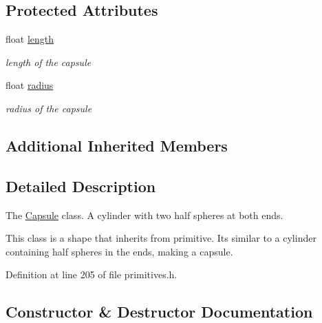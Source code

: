 \subsection*{Protected Attributes}
\begin{DoxyCompactItemize}
\item 
float \hyperlink{class_capsule_af62f20ecfc37b4c8ae88dd505ca1f196}{length}\hypertarget{class_capsule_af62f20ecfc37b4c8ae88dd505ca1f196}{}\label{class_capsule_af62f20ecfc37b4c8ae88dd505ca1f196}

\begin{DoxyCompactList}\small\item\em length of the capsule \end{DoxyCompactList}\item 
float \hyperlink{class_capsule_a9b7e591748a2b735b35d99a2d7792f39}{radius}\hypertarget{class_capsule_a9b7e591748a2b735b35d99a2d7792f39}{}\label{class_capsule_a9b7e591748a2b735b35d99a2d7792f39}

\begin{DoxyCompactList}\small\item\em radius of the capsule \end{DoxyCompactList}\end{DoxyCompactItemize}
\subsection*{Additional Inherited Members}


\subsection{Detailed Description}
The \hyperlink{class_capsule}{Capsule} class. A cylinder with two half spheres at both ends.

This class is a shape that inherits from primitive. It\textquotesingle{}s similar to a cylinder containing half spheres in the ends, making a capsule. 

Definition at line 205 of file primitives.\+h.



\subsection{Constructor \& Destructor Documentation}

